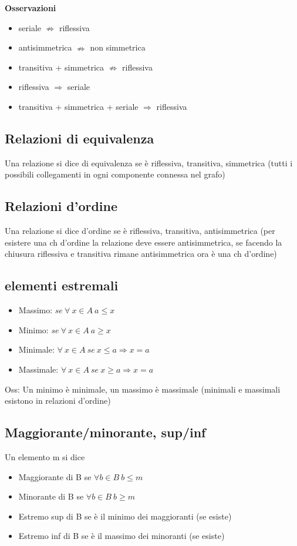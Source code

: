 \documentclass{article}
\begin{document}
\begin{multicols*}{3}
		\textbf{Osservazioni}
		\begin{itemize}
			\setlength\itemsep{0.1mm}
			\item seriale \(\nRightarrow\) riflessiva
			\item antisimmetrica \(\nRightarrow\) non simmetrica
			\item transitiva + simmetrica \(\nRightarrow\) riflessiva
			\item riflessiva \(\Rightarrow\) seriale
			\item transitiva + simmetrica + seriale \(\Rightarrow\) riflessiva
		\end{itemize}
		
		
		\subsection{Relazioni di equivalenza}
		Una relazione si dice di equivalenza se è riflessiva, transitiva, simmetrica (tutti i possibili collegamenti in ogni componente connessa nel grafo)
	
		\subsection{Relazioni d'ordine}
		Una relazione si dice d'ordine se è riflessiva, transitiva, antisimmetrica (per esistere una ch d'ordine la relazione deve essere antisimmetrica, se facendo la chiusura riflessiva e transitiva rimane antisimmetrica ora è una ch d'ordine)
		
		\subsection{elementi estremali}
		\begin{itemize}
			\setlength\itemsep{0.1mm}
			\item Massimo: \(se \ \forall \ x \in A \ a\leq x\)
			\item Minimo: \(se \ \forall \ x \in A \ a\geq x\)
			\item Minimale: \(\forall \ x \in A \ se\ x \leq a \Rightarrow x=a\)
			\item Massimale: \(\forall \ x \in A \ se\ x \geq a \Rightarrow x=a\)
		\end{itemize}
	 
	 	Oss: Un minimo è minimale, un massimo è massimale (minimali e massimali esistono in relazioni d'ordine)
	 	\subsection{Maggiorante/minorante, sup/inf}
	 	Un elemento m si dice
	 	\begin{itemize}
	 		\setlength\itemsep{0.1mm}
	 		\item Maggiorante di B se \(\forall b \in B \  b \leq m\)
	 		\item Minorante di B se \(\forall b \in B \  b \geq m\)
	 		\item Estremo sup di B se è il minimo dei maggioranti (se esiste)
	 		\item Estremo inf di B se è il massimo dei minoranti (se esiste)
 		\end{itemize}
 		

\end{multicols*}
\end{document}
